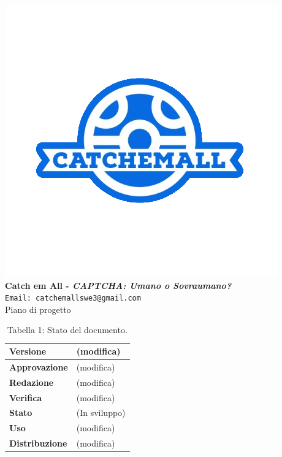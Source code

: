 \begin{titlepage}
\begin{center}
	\includegraphics[scale = 1.5]{img/logo.png}\\
	\bigskip
	\large \textbf{Catch em All - \textit{CAPTCHA: Umano o Sovraumano?}}\\
	\texttt{Email: catchemallswe3@gmail.com}\\
	\vfill
	{\fontsize{1.5cm}{0}\selectfont Piano di progetto}\\
	\vfill
	\begin{table}[h]
		\centering
		\setlength\extrarowheight{4pt}
		\begin{tabular}{| m{4.5cm} | m{4.5cm} |}
			\hline
			\textbf{Versione} & (modifica)\\
			\hline
			\textbf{Approvazione} & (modifica)\\
			\hline
			\textbf{Redazione} & (modifica)\\
			\hline
			\textbf{Verifica} & (modifica)\\
			\hline
			\textbf{Stato} & (In sviluppo)\\
			\hline
			\textbf{Uso} & (modifica)\\
			\hline
			\textbf{Distribuzione} & (modifica)\\
			\hline
		\end{tabular}\\
		\caption{Tabella 1: Stato del documento.}
	\end{table}
	
\end{center}
\end{titlepage}